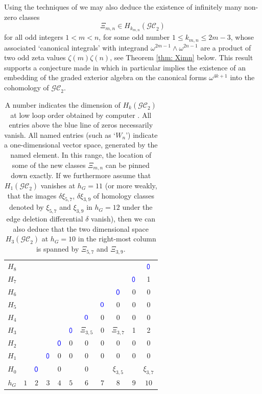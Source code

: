 \documentclass[10pt]{amsart}
\theoremstyle{plain}
\newcommand{\GC}{\mathcal{GC}}
\newcommand{\0}{\color{blue}{\mathsf{0}}}
\begin{document}
Using the techniques of \cite{BrSigma} we may also deduce the existence of infinitely many non-zero classes 
\[ \Xi_{m,n} \in H_{k_{m,n}} (\GC_2) \]
for all odd integers $1<m<n$,   for some   odd number $1 \leq k_{m,n} \leq 2m-3 $, whose associated  `canonical integrals' with  integrand $\omega^{2m-1} \wedge \omega^{2n-1}$ are a product of two odd zeta values $\zeta(m)\zeta(n)$, see Theorem \ref{thm: Ximn} below. 
This result supports a conjecture made in \cite{BrSigma} which in particular implies the existence of an embedding of the graded exterior algebra on the canonical forms $\omega^{4k+1}$ into the cohomology of $\GC_2$. 

 
\begin{table}[h]
\begin{center}
\vspace{0.1in} 
\begin{tabular}{c|cccccccccc}
$H_8$ &&&&&&&&&& $\0$   \\
$H_7$ &&&&&&&&& $\0$& 1   \\
$H_6$ &&&&&&&& $\0$ & 0& 0 \\
$H_5$ &&&&&&& $\0$ &  0 & 0& 0 \\
$H_4$ &&&&&&  $\0$ &  0 &  0& 0 &0\\
$H_3$ &&&&& $\0$ & $\Xi_{3,5}$   & 0&  $\Xi_{3,7}$ &1 &  2  \\
$H_2$ &&&& $\0$ & 0&0 & 0 & 0  & 0 & 0 \\
$H_1$ &&& $\0$ & 0 & 0 & 0 & 0 & 0 & 0 &  0 \\
$H_0$ && $\0$ & \color{red}{$W_3$} & 0&\color{red}{$W_5$} &0  & \color{red}{$W_7$} &   $\xi_{3,5}$ & \color{red}{$W_9$} & $\xi_{3,7}$ \\ 
\hline  
$h_G$ & $1$  & $2$ & $3$ & $4$ & $5$ & $6$ & $7$ & $8$& $9$& $10$
\end{tabular}
\vspace{0.2in} 
\end{center}
\caption{A number indicates the dimension of $H_k(\GC_2)$ at low loop order obtained by computer \cite{GraphComplexComputations}.  All entries above the blue line of zeros necessarily vanish.  All  named entries (such as `$W_n$') indicate a  one-dimensional vector space, generated  by the named element.  In this range, the location of some of the new classes $\Xi_{m,n}$ can be pinned down exactly. If we furthermore assume that $H_1(\GC_2)$ vanishes at $h_G=11$ (or more weakly, that the images  $\delta \xi_{5,7}$, $\delta \xi_{3,9}$ of  homology classes denoted by $ \xi_{5,7}$ and $ \xi_{3,9}$ in $h_G=12$ under  the edge deletion differential $\delta$ vanish), then we  can also  deduce that the two dimensional space $H_3(\GC_2)$  at $h_G=10$ in the right-most column is  spanned by $\Xi_{5,7}$ and $\Xi_{3,9}$. 
 } 
\label{default}\label{table:knownresults} 
\end{table}
\end{document}
